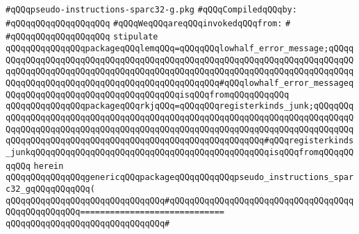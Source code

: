 \label{src/lib/compiler/back/low/main/sparc32/pseudo-instructions-sparc32-g.pkg}
\verb|#qQQqpseudo-instructions-sparc32-g.pkg|\newline
\newline
\verb|#qQQqCompiledqQQqby:|\newline
\verb|#qQQqqQQqqQQqqQQqqQQq|\newline
\newline
\verb|#qQQqWeqQQqareqQQqinvokedqQQqfrom:|\newline
\verb|#|\newline
\verb|#qQQqqQQqqQQqqQQqqQQq|\newline
\newline
\verb|stipulate|\newline
\verb|qQQqqQQqqQQqqQQqpackageqQQqlemqQQq=qQQqqQQqlowhalf_error_message;qQQqqQQqqQQqqQQqqQQqqQQqqQQqqQQqqQQqqQQqqQQqqQQqqQQqqQQqqQQqqQQqqQQqqQQqqQQqqQQqqQQqqQQqqQQqqQQqqQQqqQQqqQQqqQQqqQQqqQQqqQQqqQQqqQQqqQQqqQQqqQQqqQQqqQQqqQQqqQQqqQQqqQQqqQQqqQQqqQQqqQQqqQQq#qQQqlowhalf_error_messageqQQqqQQqqQQqqQQqqQQqqQQqqQQqqQQqqQQqisqQQqfromqQQqqQQqqQQq|\newline
\verb|qQQqqQQqqQQqqQQqpackageqQQqrkjqQQq=qQQqqQQqregisterkinds_junk;qQQqqQQqqQQqqQQqqQQqqQQqqQQqqQQqqQQqqQQqqQQqqQQqqQQqqQQqqQQqqQQqqQQqqQQqqQQqqQQqqQQqqQQqqQQqqQQqqQQqqQQqqQQqqQQqqQQqqQQqqQQqqQQqqQQqqQQqqQQqqQQqqQQqqQQqqQQqqQQqqQQqqQQqqQQqqQQqqQQqqQQqqQQqqQQqqQQqqQQq#qQQqregisterkinds_junkqQQqqQQqqQQqqQQqqQQqqQQqqQQqqQQqqQQqqQQqqQQqqQQqisqQQqfromqQQqqQQqqQQq|\newline
\verb|herein|\newline
\newline
\verb|qQQqqQQqqQQqqQQqgenericqQQqpackageqQQqqQQqqQQqpseudo_instructions_sparc32_gqQQqqQQqqQQq(|\newline
\verb|qQQqqQQqqQQqqQQqqQQqqQQqqQQqqQQq#qQQqqQQqqQQqqQQqqQQqqQQqqQQqqQQqqQQqqQQqqQQqqQQqqQQq=============================|\newline
\verb|qQQqqQQqqQQqqQQqqQQqqQQqqQQqqQQq#|\newline
